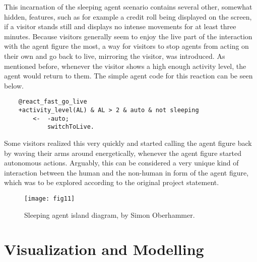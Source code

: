 \documentclass[draft,final]{vutinfth} %
\begin{document}
This incarnation of the sleeping agent scenario contains several other, somewhat hidden, features, such as for example a credit roll being displayed on the screen, if a \gls{visitor} stands still and displays no intense movements for at least three minutes. 
Because \glspl{visitor} generally seem to enjoy the \gls{live} part of the interaction with the \gls{agent figure} the most, a way for \glspl{visitor} to stop agents from acting on their own and go back to \gls{live}, mirroring the \gls{visitor}, was introduced. 
As mentioned before, whenever the \gls{visitor} shows a high enough activity level, the agent would return to them. 
The simple agent code for this reaction can be seen below.
\begin{verbatim}
    @react_fast_go_live
    +activity_level(AL) & AL > 2 & auto & not sleeping
        <-  -auto;
            switchToLive.
\end{verbatim}
Some \glspl{visitor} realized this very quickly and started calling the \gls{agent figure} back by waving their arms around energetically, whenever the \gls{agent figure} started autonomous actions. 
Arguably, this can be considered a very unique kind of interaction between the human and the non-human in form of the \gls{agent figure}, which was to be explored according to the original project statement. 
\begin{figure}[h]
	\centering
	\texttt{[image: fig11]}
	\caption{Sleeping agent island diagram, by Simon Oberhammer.}
	\label{fig:fig11_matr}
\end{figure}

\section{Visualization and Modelling}
\label{visualization}
\end{document}
